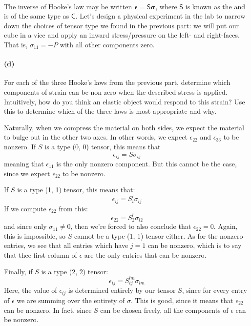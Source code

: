 \documentclass{article}
\def\stress{\boldsymbol{\sigma}}
\def\strain{\boldsymbol{\epsilon}}
\def\stiffness{\boldsymbol{\mathsf{C}}}
\def\comply{\boldsymbol{\mathsf{S}}}
\begin{document}
\paragraph{}
The inverse of Hooke's law may be written $\strain = \comply\stress$, where $\comply$ is known as the  and is of the same type as 
$\stiffness$.  Let's design a physical experiment in the lab to narrow down the choices of tensor type we found in the previous part:  we will put our cube in a vice
and apply an inward stress/pressure on the left- and right-faces.  That is, $\sigma_{11} = -P$ with all other components zero.

\paragraph{(d)}
For each of the three Hooke's laws from the previous part, determine which components of strain can be non-zero when the described stress is applied.  Intuitively,
how do you think an elastic object would respond to this strain?  Use this to determine which of the three laws is most appropriate and why.

\begin{solution}
	Naturally, when we compress the material on both sides, we expect the material to bulge out in the other 
	two axes. In other words, we expect $\epsilon_{22}$ and $\epsilon_{33}$ to be nonzero. If $S$ is a type
	(0, 0) tensor, this means that 
	\[
		\epsilon_{ij} = S \sigma_{ij}
	\] 
	meaning that $\epsilon_{11}$ is the only nonzero component. But this cannot be the case, since 
	we expect $\epsilon_{22}$ to be nonzero. 

	If $S$ is a type (1, 1) tensor, this means that:
	\[
		\epsilon_{ij} = S^l_i \sigma_{lj}
	\] 
	If we compute $\epsilon_{22}$ from this: 
	\[
		\epsilon_{22} = S^l_2 \sigma_{l2}
	\] 
	and since only $\sigma_{11} \neq 0$, then we're forced to also conclude that $\epsilon_{22} = 0$. Again, 
	this is impossible, so $S$ cannot be a type (1, 1) tensor either. As for the nonzero entries, we see
	that all entries which have $j = 1$ can be nonzero, which is to say that thee first column of $\epsilon$
	are the only entries that can be nonzero. 

	Finally, if $S$ is a type (2, 2) tensor:
	\[
		\epsilon_{ij} = S^{lm}_{ij} \sigma_{lm}
	\] 
	Here, the value of $\epsilon_{ij}$ is determined entirely by our tensor $S$, since for every entry 
	of $\epsilon$ we are summing over the entirety of $\sigma$. This is good, since it means that $\epsilon_{22}$
	can be nonzero. In fact, since $S$ can be chosen freely, all the components of $\epsilon$ can be nonzero.
\end{solution}
\end{document}
